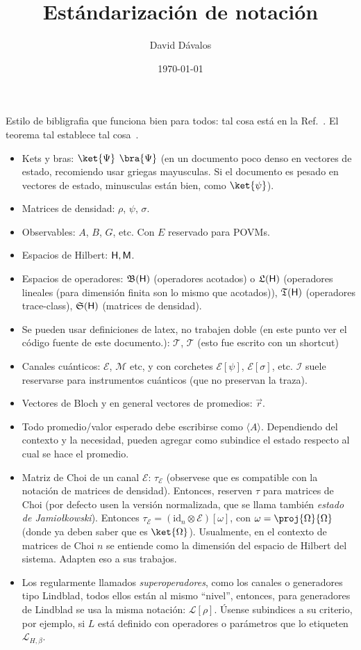 \documentclass[letterpaper,12pt]{article}
\author{David Dávalos}
\date{\today}
\title{Estándarización de notación}
\newcommand{\mcE}{\ensuremath{\mathcal{E}}}
\newcommand{\mcL}{\ensuremath{\mathcal{L}}}
\begin{document}
 
\maketitle
Estilo de bibligrafia que funciona bien para todos: tal cosa está en la Ref.~\cite{zimansbook}. El teorema tal establece tal cosa~\cite{zimansbook}.
\begin{itemize}
\item Kets y bras: $\ket{\Psi}$  $\bra{\Psi}$ (en un documento poco denso en vectores de estado, recomiendo usar griegas mayusculas. Si el documento es pesado en vectores de estado, minusculas están bien, como $\ket{\psi}$).
\item Matrices de densidad: $\rho$, $\psi$, $\sigma$.
\item Observables: $A$, $B$, $G$, etc. Con $E$ reservado para POVMs.
\item Espacios de Hilbert: ${\sf H}, {\sf M}$.
\item Espacios de operadores: $\mathfrak{B}(\sf H)$ (operadores acotados) o $\mathfrak{L}(\sf H)$ (operadores lineales (para dimensión finita son lo mismo que acotados)), $\mathfrak{T}(\sf H)$ (operadores trace-class), $\mathfrak{S}(\sf H)$ (matrices de densidad).
\item Se pueden usar definiciones de latex, no trabajen doble (en este punto ver el código fuente de este documento.):
\newcommand{\mcT}{\ensuremath{\mathcal{T}}} %
$\mcT$, \mcT{} (esto fue escrito con un shortcut)
\item Canales cuánticos: $\mathcal{E}$, $\mathcal{M}$ etc, y con corchetes $\mathcal{E}[\psi]$, $\mathcal{E}[\sigma]$, etc. $\mathcal{I}$ suele reservarse para instrumentos cuánticos (que no preservan la traza).
\item Vectores de Bloch y en general vectores de promedios: $\vec r$.
\item Todo promedio/valor esperado debe escribirse como $\langle A \rangle$. Dependiendo del contexto y la necesidad, pueden agregar como subindice el estado respecto al cual se hace el promedio.
\item Matriz de Choi de un canal $\mcE$: $\tau_\mcE$ (observese que es compatible con la notación de matrices de densidad). Entonces, reserven $\tau$ para matrices de Choi (por defecto usen la versión normalizada, que se llama también \textit{estado de Jamio\l kowski}). Entonces $\tau_\mcE=(\text{id}_n \otimes \mcE)[\omega]$, con $\omega=\proj{\Omega}{\Omega}$ (donde ya deben saber que es $\ket{\Omega}$). Usualmente, en el contexto de matrices de Choi $n$ se entiende como la dimensión del espacio de Hilbert del sistema. Adapten eso a sus trabajos.
\item Los regularmente llamados \textit{superoperadores}, como los canales o generadores tipo Lindblad, todos ellos están al mismo ``nivel'', entonces, para generadores de Lindblad se usa la misma notación: $\mcL[\rho]$. Úsense subindices a su criterio, por ejemplo, si $L$ está definido con operadores o parámetros que lo etiqueten $\mcL_{H, \beta}$.
\end{itemize}



\medline %


\end{document}
